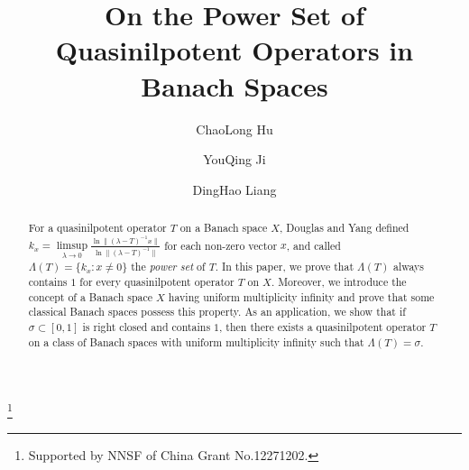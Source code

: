 \documentclass[12pt]{amsart}
\numberwithin{equation}{section}
\theoremstyle{plain}
\theoremstyle{definition}
\renewcommand{\P}{{\mathcal{P}}}
\begin{document}
\title{On the Power Set of Quasinilpotent Operators in Banach Spaces}

\author[C. L. Hu]{ChaoLong Hu}
\address{ChaoLong HU: School of Mathematics\\Jilin University\\Changchun 130012\\P.R. CHINA;
School of Mathematics and Science\\Henan Institute of Science and Technology\\ Xinxiang 453003\\ P.R. CHINA}


\author[Y. Q. Ji]{YouQing Ji}
\address{YouQing JI: School of Mathematics\\Jilin University\\Changchun 130012\\P.R. CHINA}


\author[D. H. Liang]{DingHao Liang}
\address{DingHao LIANG: School of Mathematics\\Jilin University\\Changchun 130012\\P.R. CHINA}

\thanks{Supported by NNSF of China Grant No.12271202.}
\begin{abstract}
  For a quasinilpotent operator $T$ on a Banach space $X$,
  Douglas and Yang defined
  $k_{x}=\limsup\limits_{\lambda\rightarrow 0}\frac{\ln\|(\lambda-T)^{-1}x\|}{\ln\|(\lambda-T)^{-1}\|}$
  for each non-zero vector $x$, and called $\Lambda(T)=\{k_x:x\neq 0\}$ the
  {\it power set} of $T$.
  In this paper, we prove that $\Lambda(T)$ always contains $1$ for every quasinilpotent operator $T$ on $X$.
  Moreover, we introduce the concept of a Banach space $X$ having uniform multiplicity infinity and prove that some classical Banach spaces possess this property.
  As an application,
  we show that if $\sigma\subset [0,1]$ is right closed and contains $1$, then there exists a quasinilpotent operator $T$ on a class of Banach spaces with uniform multiplicity infinity such that $\Lambda(T)=\sigma$.
\end{abstract}
\maketitle
\end{document}
